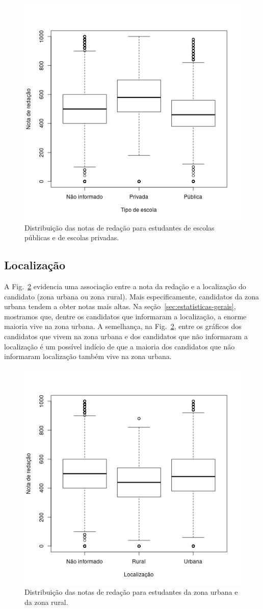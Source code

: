 \documentclass[12pt]{article}
\newcommand{\reffig}[1]{Fig.~\ref{fig:#1}}
\begin{document}
\begin{figure}[H]
\centering\includegraphics[width=.5\linewidth]{../correlacao_escola.png}
\caption{Distribuição das notas de redação para estudantes de escolas públicas e de escolas privadas.}
\label{fig:correlacao-escola}
\end{figure}

\subsection{Localização}
A \reffig{correlacao-localizacao} evidencia uma associação entre a nota da redação e a localização do candidato (zona urbana ou zona rural).
Mais especificamente, candidatos da zona urbana tendem a obter notas mais altas.
Na seção~\ref{sec:estatisticas-gerais}, mostramos que, dentre os candidatos que informaram a localização, a enorme maioria vive na zona urbana.
A semelhança, na \reffig{correlacao-localizacao}, entre os gráficos dos candidatos que vivem na zona urbana e dos candidatos que não informaram a localização é um possível indício de que a maioria dos candidatos que não informaram localização também vive na zona urbana.

\begin{figure}[H]
\centering\includegraphics[width=.45\linewidth]{../correlacao_localizacao.png}
\caption{Distribuição das notas de redação para estudantes da zona urbana e da zona rural.}
\label{fig:correlacao-localizacao}
\end{figure}
\end{document}
